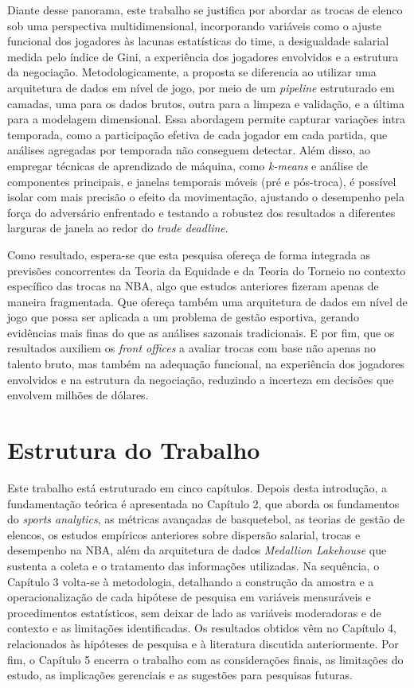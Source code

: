 Diante desse panorama, este trabalho se justifica por abordar as trocas de elenco sob uma perspectiva multidimensional, incorporando variáveis como o ajuste funcional dos jogadores às lacunas estatísticas do time, a desigualdade salarial medida pelo índice de Gini, a experiência dos jogadores envolvidos e a estrutura da negociação. Metodologicamente, a proposta se diferencia ao utilizar uma arquitetura de dados em nível de jogo, por meio de um \textit{pipeline} estruturado em camadas, uma para os dados brutos, outra para a limpeza e validação, e a última para a modelagem dimensional. Essa abordagem permite capturar variações intra temporada, como a participação efetiva de cada jogador em cada partida, que análises agregadas por temporada não conseguem detectar. Além disso, ao empregar técnicas de aprendizado de máquina, como \textit{k-means} e análise de componentes principais, e janelas temporais móveis (pré e pós-troca), é possível isolar com mais precisão o efeito da movimentação, ajustando o desempenho pela força do adversário enfrentado e testando a robustez dos resultados a diferentes larguras de janela ao redor do \textit{trade deadline}.

Como resultado, espera-se que esta pesquisa ofereça de forma integrada as previsões concorrentes da Teoria da Equidade e da Teoria do Torneio no contexto específico das trocas na NBA, algo que estudos anteriores fizeram apenas de maneira fragmentada. Que ofereça também uma arquitetura de dados em nível de jogo que possa ser aplicada a um problema de gestão esportiva, gerando evidências mais finas do que as análises sazonais tradicionais. E por fim, que os resultados auxiliem os \textit{front offices} a avaliar trocas com base não apenas no talento bruto, mas também na adequação funcional, na experiência dos jogadores envolvidos e na estrutura da negociação, reduzindo a incerteza em decisões que envolvem milhões de dólares.

\section{Estrutura do Trabalho}

Este trabalho está estruturado em cinco capítulos. Depois desta introdução, a fundamentação teórica é apresentada no Capítulo 2, que aborda os fundamentos do \textit{sports analytics}, as métricas avançadas de basquetebol, as teorias de gestão de elencos, os estudos empíricos anteriores sobre dispersão salarial, trocas e desempenho na NBA, além da arquitetura de dados \textit{Medallion Lakehouse} que sustenta a coleta e o tratamento das informações utilizadas. Na sequência, o Capítulo 3 volta-se à metodologia, detalhando a construção da amostra e a operacionalização de cada hipótese de pesquisa em variáveis mensuráveis e procedimentos estatísticos, sem deixar de lado as variáveis moderadoras e de contexto e as limitações identificadas. Os resultados obtidos vêm no Capítulo 4, relacionados às hipóteses de pesquisa e à literatura discutida anteriormente. Por fim, o Capítulo 5 encerra o trabalho com as considerações finais, as limitações do estudo, as implicações gerenciais e as sugestões para pesquisas futuras.
